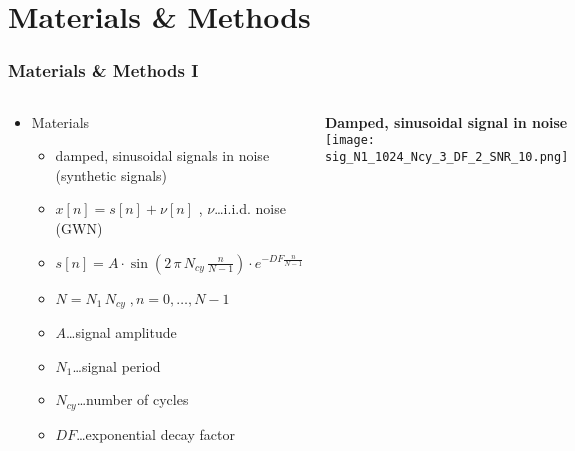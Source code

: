 \documentclass[11pt,aspectratio=169]{beamer}
\begin{document}
	\section{Materials \& Methods}
	\begin{frame}
		\frametitle{Materials \& Methods I}
		\begin{columns}
			\begin{RIPcolleft}
				\begin{itemize}
					\setlength\itemsep{0.5em}
					\item \textcolor{RIPtitlecol}{Materials}
					\begin{itemize}
						\setlength\itemsep{0.5em}
						\item damped, sinusoidal signals in noise (synthetic signals)
						\item $x[n] = s[n] + \nu[n]$ , $\nu$\ldots i.i.d. noise (GWN)
						\item $s[n] = A \cdot \sin(2 \, \pi \, N_{cy} \, \frac{n}{N-1}) \cdot e^{-DF \frac{n}{N-1}}$
						\item $N = N_1 \, N_{cy} \; , n = 0,\ldots,N-1$
						\item $A$\ldots signal amplitude
						\item $N_1$\ldots signal period
						\item $N_{cy}$\ldots number of cycles
						\item $DF$\ldots exponential decay factor
					\end{itemize}
				\end{itemize}
			\end{RIPcolleft}
			\begin{RIPcolright}
				\textbf{Damped, sinusoidal signal in noise}\\
				\vspace{1em}
				\texttt{[image: sig\_N1\_1024\_Ncy\_3\_DF\_2\_SNR\_10.png]}
			\end{RIPcolright}
		\end{columns}
	\end{frame}
\end{document}

